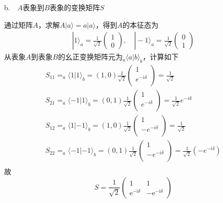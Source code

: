 b.\ \  $A$表象到$B$表象的变换矩阵$S$

通过矩阵$A$，求解$A|a \rangle=a|a \rangle$，得到$A$的本征态为
$$
\begin{array}{l}
|1\rangle_{a}=\frac{1}{\sqrt{2}}\left(\begin{array}{l}
1 \\
0
\end{array}\right), \quad|-1\rangle_{a}=\frac{1}{\sqrt{2}}\left(\begin{array}{l}
0 \\
1
\end{array}\right)
\end{array}
$$
从表象$A$到表象$B$的幺正变换矩阵元为$_a\langle a|b\rangle _b$，计算如下
$$
\begin{array}{l}
	\left. S_{11}=_a\langle 1|1\rangle _b=(1,0)\frac{1}{\sqrt{2}}\left( \begin{array}{c}
	1\\
	e^{-i\delta}\\
\end{array} \right) =\frac{1}{\sqrt{2}} \right.\\
	S_{21}=_a\langle -1|1\rangle _b=(0,1)\frac{1}{\sqrt{2}}\left( \begin{array}{c}
	1\\
	e^{-i\delta}\\
\end{array} \right) =\frac{1}{\sqrt{2}}e^{-i\delta}\\
	S_{12}=_a\langle 1|-1\rangle _b=(1,0)\frac{1}{\sqrt{2}}\left( \begin{array}{c}
	1\\
	-e^{-i\delta}\\
\end{array} \right) =\frac{1}{\sqrt{2}}\\
	S_{22}=_a\langle -1|-1\rangle _b=(0,1)\frac{1}{\sqrt{2}}\left( \begin{array}{c}
	1\\
	-e^{-i\delta}\\
\end{array} \right) =\frac{1}{\sqrt{2}}\left( -e^{-i\delta} \right)\\
\end{array}
$$
故
$$
S=\frac{1}{\sqrt{2}}\left(\begin{array}{cc}
1 & 1 \\
\mathrm{e}^{-\mathrm{i} \delta} & -\mathrm{e}^{-\mathrm{i} \delta}
\end{array}\right)
$$